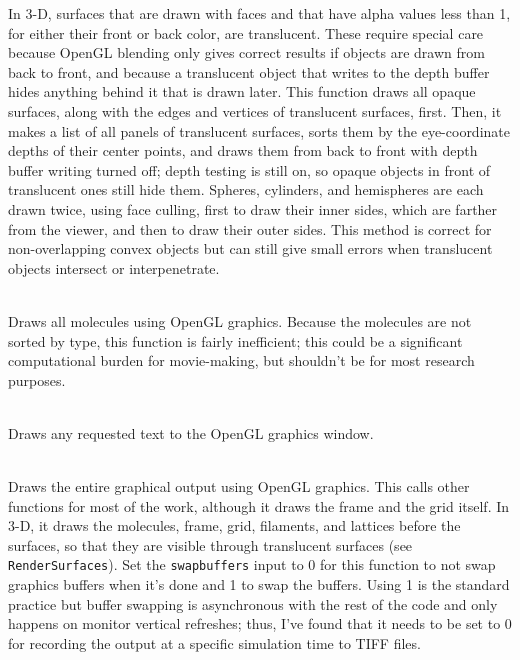 \documentclass {scrbook}
\newcommand {\ttt} {\texttt}
\begin{document}
\begin{description}
In 3-D, surfaces that are drawn with faces and that have alpha values less than 1, for either their front or back color, are translucent. These require special care because OpenGL blending only gives correct results if objects are drawn from back to front, and because a translucent object that writes to the depth buffer hides anything behind it that is drawn later. This function draws all opaque surfaces, along with the edges and vertices of translucent surfaces, first. Then, it makes a list of all panels of translucent surfaces, sorts them by the eye-coordinate depths of their center points, and draws them from back to front with depth buffer writing turned off; depth testing is still on, so opaque objects in front of translucent ones still hide them. Spheres, cylinders, and hemispheres are each drawn twice, using face culling, first to draw their inner sides, which are farther from the viewer, and then to draw their outer sides. This method is correct for non-overlapping convex objects but can still give small errors when translucent objects intersect or interpenetrate.

\item[\ttt{void RenderMolecs(simptr sim)}]
\hfill \\
Draws all molecules using OpenGL graphics. Because the molecules are not sorted by type, this function is fairly inefficient; this could be a significant computational burden for movie-making, but shouldn't be for most research purposes.

\item[\ttt{void RenderText(simptr sim)}]
\hfill \\
Draws any requested text to the OpenGL graphics window.

\item[\ttt{void RenderSim(simptr sim, int swapbuffers)}]
\hfill \\
Draws the entire graphical output using OpenGL graphics. This calls other functions for most of the work, although it draws the frame and the grid itself. In 3-D, it draws the molecules, frame, grid, filaments, and lattices before the surfaces, so that they are visible through translucent surfaces (see \ttt{RenderSurfaces}). Set the \ttt{swapbuffers} input to 0 for this function to not swap graphics buffers when it's done and 1 to swap the buffers. Using 1 is the standard practice but buffer swapping is asynchronous with the rest of the code and only happens on monitor vertical refreshes; thus, I've found that it needs to be set to 0 for recording the output at a specific simulation time to TIFF files.


\end{description}
\end{document}
